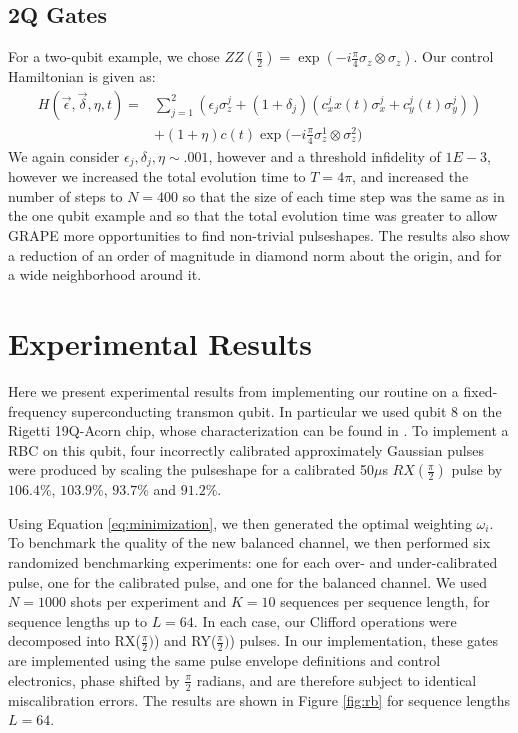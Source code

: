 \documentclass[aps,nofootinbib,pra,notitlepage,twocolumn]{revtex4-1}
\begin{document}
\subsection{2Q Gates}\label{2Q Gates}
 For a two-qubit example, we chose $ZZ(\frac{\pi}{2})=\exp{(-i\frac{\pi}{4}\sigma_z\otimes\sigma_z)}$. Our control Hamiltonian is given as:
\begin{equation} \label{eq:2Qham}
\begin{split}
H(\vec{\epsilon}, \vec{\delta}, \eta, t) = &\sum_{j=1}^2(\epsilon_j\sigma_z^j + (1 + \delta_j)(c_x^jx(t)\sigma_x^j + c_y^j(t)\sigma_y^j)) \\
&+ (1+\eta)c(t) \exp{(-i\frac{\pi}{4}\sigma_z^1\otimes\sigma_z^2})
\end{split}
\end{equation}
We again consider $\epsilon_j, \delta_j, \eta \sim .001$, however and a threshold infidelity of $1E-3$, however we increased the total evolution time to $T=4\pi$, and increased the number of steps to $N=400$ so that the size of each time step was the same as in the one qubit example and so that the total evolution time was greater to allow GRAPE more opportunities to find non-trivial pulseshapes. The results also show a reduction of an order of magnitude in diamond norm about the origin, and for a wide neighborhood around it.

\section{Experimental Results}\label{experimental}
Here we present experimental results from implementing our routine on a fixed-frequency superconducting transmon qubit. In particular we used qubit 8 on the Rigetti 19Q-Acorn chip, whose characterization can be found in \cite{1712.05771}. To implement a RBC on this qubit, four incorrectly calibrated approximately Gaussian pulses were produced by scaling the pulseshape for a calibrated 50$\mu$s $RX(\frac{\pi}{2})$ pulse by $106.4\%$,  $103.9\%$, $93.7\%$ and $91.2\%$.

 Using Equation \ref{eq:minimization}, we then generated the optimal weighting $\omega_i$. To benchmark the quality of the new balanced channel, we then performed six randomized benchmarking experiments: one for each over- and under-calibrated pulse, one for the calibrated pulse, and one for the balanced channel. We used $N=1000$ shots per experiment and $K=10$ sequences per sequence length, for sequence lengths up to $L=64$\cite{Magesan2011}. In each case, our Clifford operations were decomposed into RX($\frac{\pi}{2})$) and RY($\frac{\pi}{2})$) pulses. In our implementation, these gates are implemented using the same pulse envelope definitions and control electronics, phase shifted by $\frac{\pi}{2}$ radians, and are therefore subject to identical miscalibration errors. The results are shown in Figure \ref{fig:rb} for sequence lengths $L=64$.
\end{document}
